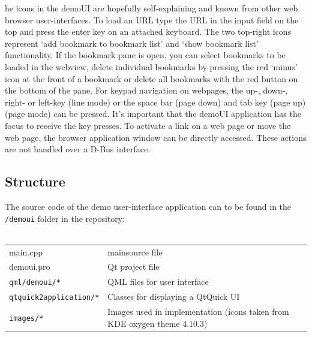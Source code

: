 \documentclass{pelagicore}
\begin{document}
he icons in the demoUI are hopefully self-explaining and known from other web
browser user-interfaces. To load an URL type the URL in the input field on the
top and press the enter key on an attached keyboard. The two top-right icons
represent `add bookmark to bookmark list' and `show bookmark list'
functionality. If the bookmark pane is open, you can select bookmarks to be
loaded in the webview, delete individual bookmarks by pressing the red `minus'
icon at the front of a bookmark or delete all bookmarks with the red button on
the bottom of the pane. For keypad navigation on webpages, the up-, down-,
right- or left-key (line mode) or the space bar (page down) and tab key (page
up) (page mode) can be pressed. It's important that the demoUI application has
the focus to receive the key presses. To activate a link on a web page or move
the web page, the browser application window can be directly accessed. These
actions are not handled over a D-Bus interface.

\subsection{Structure}
The source code of the demo user-interface application can to be found in the
{\tt /demoui} folder in the repository:
\\\\
\begin{tabularx}{0.9\textwidth}{l X}
    main.cpp                    & mainsource file \\
    demoui.pro                  & Qt project file \\
    {\tt qml/demoui/*}          & QML files for user interface \\
    {\tt qtquick2application/*} & Classes for displaying a QtQuick UI \\
    {\tt images/*}              & Images used in implementation (icons taken
                                  from KDE oxygen theme 4.10.3)
\end{tabularx}
\\\\
\end{document}
